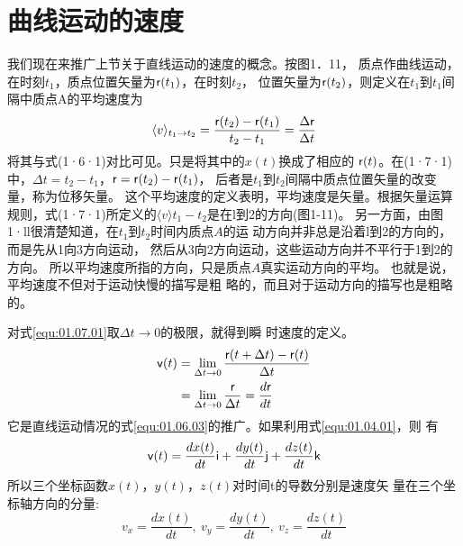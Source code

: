 \section{曲线运动的速度}\label{sec:01.07}

我们现在来推广上节关于直线运动的速度的概念。按图1．11，
质点作曲线运动，在时刻$t_1$，质点位置矢量为${\sf r}(t_1)$，在时刻$t_2$，
位置矢量为${\sf r}(t_2)$，则定义在$t_1$到$t_1$间隔中质点A的平均速度为
\begin{equation}\label{equ:01.07.01}
    \langle v \rangle_{t_1\rightarrow t_2}=\frac{{\sf r}(t_2)-{\sf r}(t_1)}{t_2-t_1}=\frac{\Delta {\sf r}}{\Delta t}
\end{equation}
将其与式(1·6·1)对比可见。只是将其中的$x(t)$换成了相应的
${\sf r}(t)$。在(1·7·1)中，$\Delta t=t_2-t_1$，${\sf r}={\sf r}(t_2)-{\sf r}(t_1)$，
后者是$t_1$到$t_2$间隔中质点位置矢量的改变量，称为位移矢量。
这个平均速度的定义表明，平均速度是矢量。根据矢量运算
规则，式(1·7·1)所定义的$\langle v\rangle t_1-t_2$是在l到2的方向(图1-11)。
另一方面，由图1·ll很清楚知道，在$t_1$到$t_2$时间内质点$A$的运
动方向并非总是沿着l到2的方向的，而是先从1向3方向运动，
然后从3向2方向运动，这些运动方向并不平行于1到2的方向。
所以平均速度所指的方向，只是质点$A$真实运动方向的平均。
也就是说，平均速度不但对于运动快慢的描写是粗
略的，而且对于运动方向的描写也是粗略的。

对式\eqref{equ:01.07.01}取$\Delta t \rightarrow 0$的极限，就得到瞬
时速度的定义。
\begin{equation}\label{equ:01.07.02}
    \begin{aligned}
        {\sf v}(t) & =\lim _{\Delta t \rightarrow 0} \frac{{\sf r}(t+\Delta t)-{\sf r}(t)}{\Delta t} \\
                  & =\lim _{\Delta t \rightarrow 0} \frac{{\sf r}}{\Delta t} =\frac{d{\sf r}}{dt}
    \end{aligned}
\end{equation}
它是直线运动情况的式\eqref{equ:01.06.03}的推广。如果利用式\eqref{equ:01.04.01}，则
有
\begin{equation}\label{equ:01.07.03}
    {\sf v}(t)=\frac{d x(t)}{d t} {\sf i}+\frac{d y(t)}{d t} {\sf j}+\frac{d z(t)}{d t} {\sf k}
\end{equation}
所以三个坐标函数$x(t)$，$y(t)$，$z(t)$对时间t的导数分别是速度矢
量在三个坐标轴方向的分量:
\begin{equation}\label{equ:01.07.04}
    v_{x}=\frac{d x(t)}{d t}, ~ v_{y}=\frac{d y(t)}{d t}, ~ v_{z}=\frac{d z(t)}{d t}
\end{equation}

